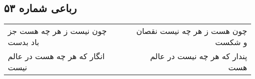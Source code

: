 \begin{center}
\section*{رباعی شماره ۵۳}
\label{sec:sh053}
\begin{longtable}{l p{0.5cm} r}
چون نیست ز هر چه هست جز باد بدست
&&
چون هست ز هر چه نیست نقصان و شکست
\\
انگار که هر چه هست در عالم نیست
&&
پندار که هر چه نیست در عالم هست
\\
\end{longtable}
\end{center}
